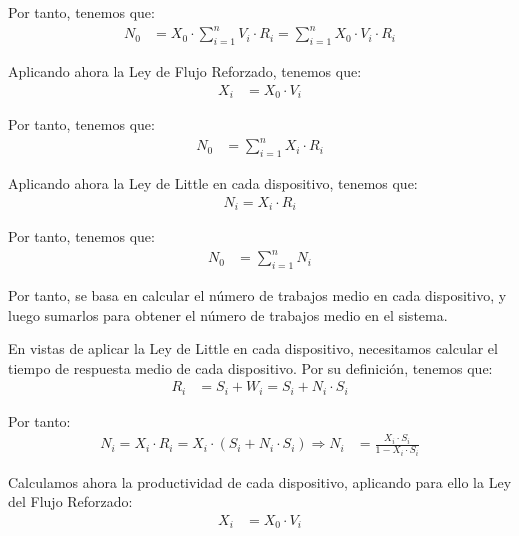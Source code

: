 \documentclass[12pt]{article}
\begin{document}
\begin{ejercicio}[2 puntos]
\begin{enumerate}
            Por tanto, tenemos que:
            \begin{align*}
                N_0 &= X_0\cdot \sum_{i=1}^{n} V_i\cdot R_i
                = \sum_{i=1}^{n} X_0\cdot V_i\cdot R_i
            \end{align*}

            Aplicando ahora la Ley de Flujo Reforzado, tenemos que:
            \begin{align*}
                X_i &= X_0\cdot V_i
            \end{align*}

            Por tanto, tenemos que:
            \begin{align*}
                N_0 &= \sum_{i=1}^{n} X_i\cdot R_i
            \end{align*}

            Aplicando ahora la Ley de Little en cada dispositivo, tenemos que:
            \begin{align*}
                N_i = X_i\cdot R_i
            \end{align*}

            Por tanto, tenemos que:
            \begin{align*}
                N_0 &= \sum_{i=1}^{n} N_i
            \end{align*}

            Por tanto, se basa en calcular el número de trabajos medio en cada dispositivo, y luego sumarlos para obtener el número de trabajos medio en el sistema.

            En vistas de aplicar la Ley de Little en cada dispositivo, necesitamos calcular el tiempo de respuesta medio de cada dispositivo. Por su definición, tenemos que:
            \begin{align*}
                R_i &= S_i + W_i = S_i + N_i\cdot S_i
            \end{align*}

            Por tanto:
            \begin{align*}
                N_i = X_i\cdot R_i
                = X_i\cdot (S_i + N_i\cdot S_i)
                \Longrightarrow N_i &= \frac{X_i\cdot S_i}{1 - X_i\cdot S_i}
            \end{align*}

            Calculamos ahora la productividad de cada dispositivo, aplicando para ello la Ley del Flujo Reforzado:
            \begin{align*}
                X_i &= X_0\cdot V_i
            \end{align*}


\end{enumerate}
\end{ejercicio}
\end{document}
